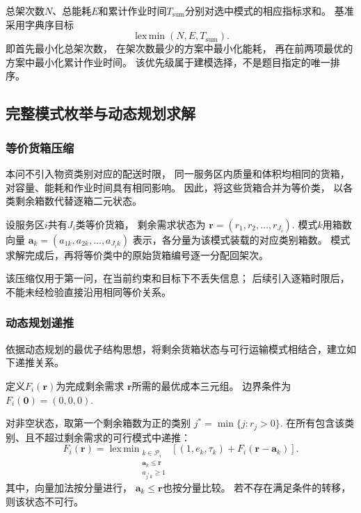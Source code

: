 \documentclass[bwprint]{gmcmthesis}
\begin{document}
总架次数$N$、总能耗$E$和累计作业时间$T_{\mathrm{sum}}$分别对选中模式的相应指标求和。
基准采用字典序目标
\begin{equation}
    \operatorname{lex\,min}
    \left(N,E,T_{\mathrm{sum}}\right).
\label{eq:q1_lex_objective}
\end{equation}
即首先最小化总架次数，
在架次数最少的方案中最小化能耗，
再在前两项最优的方案中最小化累计作业时间。
该优先级属于建模选择，不是题目指定的唯一排序。

\subsection{完整模式枚举与动态规划求解}

\subsubsection{等价货箱压缩}

本问不引入物资类别对应的配送时限，
同一服务区内质量和体积均相同的货箱，
对容量、能耗和作业时间具有相同影响。
因此，将这些货箱合并为等价类，
以各类剩余箱数代替逐箱二元状态。

设服务区$i$共有$J_i$类等价货箱，
剩余需求状态为
\(\boldsymbol{r} = (r_1,r_2,\ldots,r_{J_i})\).
模式$k$用箱数向量
\(\boldsymbol{a}_k = (a_{1k},a_{2k},\ldots,a_{J_i k})\)
表示，各分量为该模式装载的对应类别箱数。
模式求解完成后，再将等价类中的原始货箱编号逐一分配回架次。

该压缩仅用于第一问，在当前约束和目标下不丢失信息；
后续引入逐箱时限后，不能未经检验直接沿用相同等价关系。

\subsubsection{动态规划递推}
依据动态规划的最优子结构思想\cite{bellman1957}，将剩余货箱状态与可行运输模式相结合，建立如下递推关系。


定义$F_i(\boldsymbol{r})$为完成剩余需求
$\boldsymbol{r}$所需的最优成本三元组。
边界条件为
\(F_i(\boldsymbol{0})=(0,0,0)\).

对非空状态，取第一个剩余箱数为正的类别
\(j^{*} = \min\{j:r_j>0\}\).
在所有包含该类别、且不超过剩余需求的可行模式中递推：
\begin{equation}
    F_i(\boldsymbol{r})
    =
    \operatorname{lex\,min}_{\substack{
        k\in\mathcal{P}_i\\
        \boldsymbol{a}_k\leq\boldsymbol{r}\\
        a_{j^{*}k}\geq1
    }}
    \left[
        (1,e_k,\tau_k)
        +
        F_i(\boldsymbol{r}-\boldsymbol{a}_k)
    \right].
\label{eq:q1_dp}
\end{equation}
其中，向量加法按分量进行，
$\boldsymbol{a}_k\leq\boldsymbol{r}$也按分量比较。
若不存在满足条件的转移，则该状态不可行。
\end{document}
